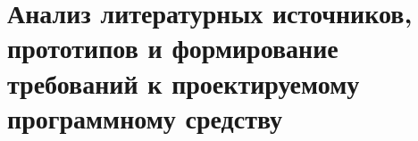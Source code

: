 \section{Анализ литературных источников, прототипов и формирование
требований к проектируемому программному средству}
\label{sec:analysis}

\cite{gost_19.701}